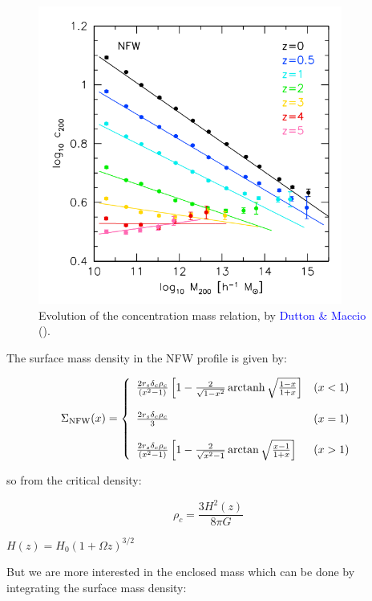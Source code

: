 \begin{appendices}
\begin{figure}[H]
\centering
\includegraphics[width=10cm]{images/dutton.png}
\caption[Evolution of the concentration mass relation]{Evolution of the concentration mass relation, by \textcolor{blue}{Dutton \& Maccio} (\citeyear{Reference23}).}
\end{figure}

The surface mass density in the NFW profile is given by:

\begin{equation}
\Sigma_{\text{NFW}}(x) = \left\lbrace
\begin{array}{lll}
\frac{2r_{s}\delta_{c}\rho_{c}}{\left(x^{2}-1\right)}\left[1-\frac{2}{\sqrt{1-x^{2}}}\operatorname{arctanh}\sqrt{\frac{1-x}{1+x}}\right] & (x<1)\\\\
\frac{2r_{s}\delta_{c}\rho_{c}}{3} & (x=1)\\\\
\frac{2r_{s}\delta_{c}\rho_{c}}{\left(x^{2}-1\right)}\left[1-\frac{2}{\sqrt{x^{2}-1}}\arctan\sqrt{\frac{x-1}{1+x}}\right] & (x>1)
\end{array}
\right.
\end{equation} 

so from the critical density:

\begin{equation}
\rho_{c}=\frac{3H^2(z)}{8\pi G}
\end{equation}

$H(z)=H_{0}(1+\Omega z)^{3/2}$

But we are more interested in the enclosed mass which can be done by integrating the surface mass density:


\end{appendices}
